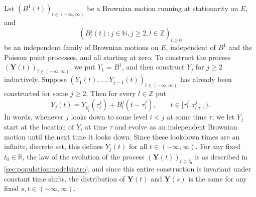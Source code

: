 \documentclass[reqno,draft]{amsart}
\numberwithin{equation}{section}
\theoremstyle{plain}
\theoremstyle{remark}
\newcommand{\R}{\mathbb{R}} %
\newcommand{\Z}{\mathbb{Z}} %
\newcommand{\N}{\mathbb{N}} %
\begin{document}
Let $(B^1(t))_{t \in (-\infty,\infty)}$ be a Brownian motion running at stationarity on $E$, and \[
    (B^j_l(t)\colon j\in \N, j\ge 2, l\in \Z)_{t\ge 0}
\] be an independent family of Brownian motions on $E$, independent of $B^1$ and the Poisson point processes, and all starting at zero. To construct the process $(\boldsymbol Y(t))_{t\in (-\infty,\infty)}$, we put $Y_1 = B^1$, and then construct $Y_j$ for $j \ge 2$ inductively. Suppose $(Y_1(t), \ldots ,Y_{j-1}(t))_{t \in (-\infty,\infty)}$ has already been constructed for some $j \ge 2$. Then for every $l\in \Z$ put %
\[
    Y_j(t) = Y_{k_l^j}(\tau^j_l) + B^j_l(t-\tau^j_l),\qquad t\in [\tau^j_l,\tau^j_{l+1}).
\] In words, whenever $j$ looks down to some level $i < j$ at some time $\tau$, we let $Y_j$ start at the location of $Y_i$ at time $\tau$ and evolve as an independent Brownian motion until the next time it looks down. Since these lookdown times are an infinite, discrete set, this defines $Y_j(t)$ for all $t\in (-\infty,\infty)$. For any fixed $t_0 \in \R$, the law of the evolution of the process $(\boldsymbol Y(t))_{t \ge t_0}$ is as described in \cref{sec:populationmodelsintro}, and since this entire construction is invariant under constant time shifts, the distribution of $\boldsymbol Y(t)$ and $\boldsymbol Y(s)$ is the same for any fixed $s,t\in (-\infty,\infty)$. %
\end{document}
